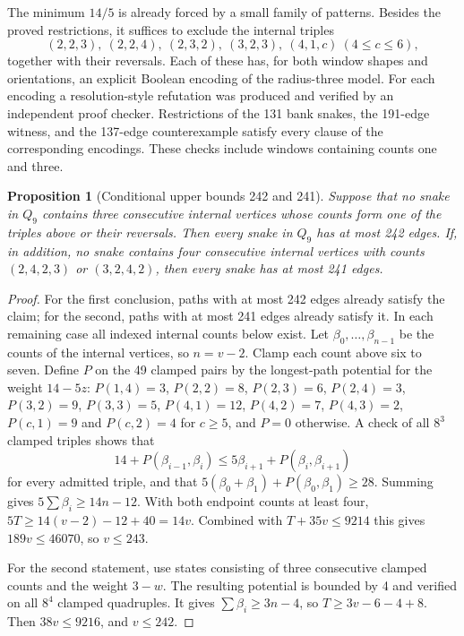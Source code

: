 \documentclass[11pt,a4paper]{article}
\newtheorem{proposition}[theorem]{Proposition}
\theoremstyle{definition}
\theoremstyle{remark}
\newcommand{\Q}{Q}
\begin{document}
The minimum $14/5$ is already forced by a small family of patterns. Besides the proved restrictions, it suffices to exclude the internal triples
\[
(2,2,3),\ (2,2,4),\ (2,3,2),\ (3,2,3),\ (4,1,c)\ (4\le c\le6),
\]
together with their reversals. Each of these has, for both window shapes and orientations, an explicit Boolean encoding of the radius-three model. For each encoding a resolution-style refutation was produced and verified by an independent proof checker. Restrictions of the 131 bank snakes, the 191-edge witness, and the 137-edge counterexample satisfy every clause of the corresponding encodings. These checks include windows containing counts one and three.

\begin{proposition}[Conditional upper bounds 242 and 241]\label{prop:window-aggregate}
Suppose that no snake in $\Q_9$ contains three consecutive internal vertices whose counts form one of the triples above or their reversals. Then every snake in $\Q_9$ has at most 242 edges. If, in addition, no snake contains four consecutive internal vertices with counts $(2,4,2,3)$ or $(3,2,4,2)$, then every snake has at most 241 edges.
\end{proposition}
\begin{proof}
For the first conclusion, paths with at most 242 edges already satisfy the claim; for the second, paths with at most 241 edges already satisfy it. In each remaining case all indexed internal counts below exist.
Let $\beta_0,\ldots,\beta_{n-1}$ be the counts of the internal vertices, so $n=v-2$. Clamp each count above six to seven. Define $P$ on the 49 clamped pairs by the longest-path potential for the weight $14-5z$:
$P(1,4)=3$, $P(2,2)=8$, $P(2,3)=6$, $P(2,4)=3$, $P(3,2)=9$, $P(3,3)=5$, $P(4,1)=12$, $P(4,2)=7$, $P(4,3)=2$, $P(c,1)=9$ and $P(c,2)=4$ for $c\ge5$, and $P=0$ otherwise. A check of all $8^3$ clamped triples shows that
\[
14+P(\beta_{i-1},\beta_i)\le5\beta_{i+1}+P(\beta_i,\beta_{i+1})
\]
for every admitted triple, and that $5(\beta_0+\beta_1)+P(\beta_0,\beta_1)\ge28$. Summing gives $5\sum\beta_i\ge14n-12$. With both endpoint counts at least four, $5T\ge14(v-2)-12+40=14v$. Combined with $T+35v\le9214$ this gives $189v\le46070$, so $v\le243$.

For the second statement, use states consisting of three consecutive clamped counts and the weight $3-w$. The resulting potential is bounded by 4 and verified on all $8^4$ clamped quadruples. It gives $\sum\beta_i\ge3n-4$, so $T\ge3v-6-4+8$. Then $38v\le9216$, and $v\le242$.
\end{proof}
\end{document}
